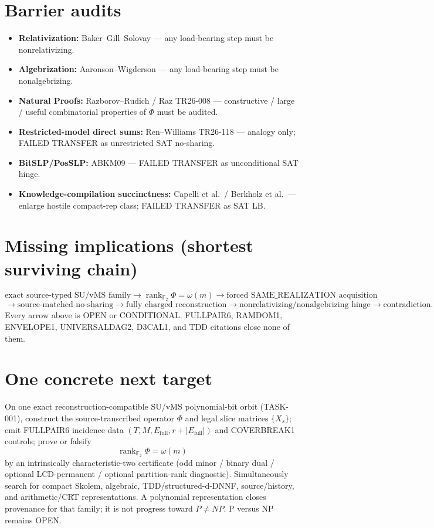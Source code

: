 \documentclass[11pt]{article}
\begin{document}
\section*{Barrier audits}
\begin{itemize}
\item \textbf{Relativization:} Baker--Gill--Solovay --- any load-bearing step must
be nonrelativizing.
\item \textbf{Algebrization:} Aaronson--Wigderson --- any load-bearing step must
be nonalgebrizing.
\item \textbf{Natural Proofs:} Razborov--Rudich / Raz TR26-008 --- constructive /
large / useful combinatorial properties of $\Phi$ must be audited.
\item \textbf{Restricted-model direct sums:} Ren--Williams TR26-118 --- analogy
only; FAILED TRANSFER as unrestricted SAT no-sharing.
\item \textbf{BitSLP/PosSLP:} ABKM09 --- FAILED TRANSFER as unconditional SAT hinge.
\item \textbf{Knowledge-compilation succinctness:} Capelli et al.\ / Berkholz et
al.\ --- enlarge hostile compact-rep class; FAILED TRANSFER as SAT LB.
\end{itemize}

\section*{Missing implications (shortest surviving chain)}
\[
\text{exact source-typed SU/vMS family}
\to \operatorname{rank}_{\mathbb F_2}\Phi=\omega(m)
\to \text{forced SAME\_REALIZATION acquisition}
\]
\[
\to \text{source-matched no-sharing}
\to \text{fully charged reconstruction}
\to \text{nonrelativizing/nonalgebrizing hinge}
\to \text{contradiction}.
\]
Every arrow above is OPEN or CONDITIONAL. FULLPAIR6, RAMDOM1, ENVELOPE1,
UNIVERSALDAG2, D3CAL1, and TDD citations close none of them.

\section*{One concrete next target}
On one exact reconstruction-compatible SU/vMS polynomial-bit orbit (TASK-001),
construct the source-transcribed operator $\Phi$ and legal slice matrices
$\{X_s\}$; emit FULLPAIR6 incidence data $(T,M,E_{\mathrm{full}},r+|E_{\mathrm{full}}|)$
and COVERBREAK1 controls; prove or falsify
\[
\operatorname{rank}_{\mathbb F_2}\Phi=\omega(m)
\]
by an intrinsically characteristic-two certificate (odd minor / binary dual /
optional LCD-permanent / optional partition-rank diagnostic). Simultaneously
search for compact Skolem, algebraic, TDD/structured-d-DNNF, source/history, and
arithmetic/CRT representations. A polynomial representation closes provenance for
that family; it is not progress toward $P\neq NP$.
P versus NP remains OPEN.
\end{document}
